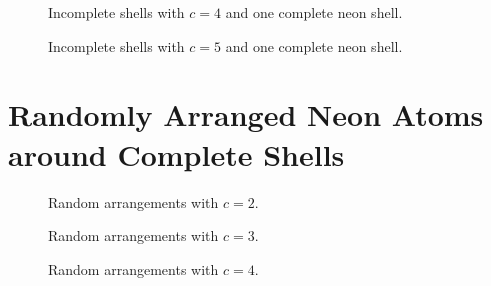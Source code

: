 \begin{figure}[h]
    \centering
    
    \caption{Incomplete shells with $c=4$ and one complete neon shell.}
    \label{incompl00-core01}
\end{figure}

\begin{figure}
    \centering
    
    \caption{Incomplete shells with $c=5$ and one complete neon shell.}
    \label{incompl01-core05}
\end{figure}

\clearpage


\section{Randomly Arranged Neon Atoms around Complete Shells}
\begin{figure}[h]
    \centering
    
    \caption{Random arrangements with $c=2$.}
    \label{random-core02}
\end{figure}

\begin{figure}
    \centering
    
    \caption{Random arrangements with $c=3$.}
    \label{random-core03}
\end{figure}

\begin{figure}[h]
    \centering
    
    \caption{Random arrangements with $c=4$.}
    \label{random-core04}
\end{figure}
